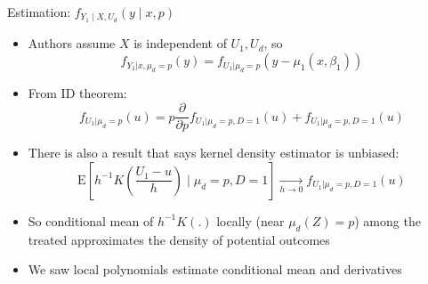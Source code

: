 \documentclass{beamer}
\begin{document}
\begin{frame}{Estimation: $f_{Y_1\mid X,U_d}(y\mid x,p)$}
  \begin{itemize}
\item Authors assume $X$ is independent of $U_1,U_d$, so
\begin{equation*}
  f_{Y_1|x,\mu_d=p}(y) = f_{U_1|\mu_d=p}(y-\mu_1(x,\beta_1))
\end{equation*}

\item From ID theorem:
  \begin{equation*}
    f_{U_1|\mu_d=p}(u) = p \frac{\partial}{\partial
    p}f_{U_1|\mu_d=p,D=1}(u) + f_{U_1|\mu_d=p,D=1}(u)
  \end{equation*}
\item There is also a result that says kernel density estimator is
  unbiased:
  \begin{equation*}
    \mathrm{E}\left[h^{-1}K\left(\frac{U_1-u}{h}\right)\mid \mu_d=p,
      D=1\right]\xrightarrow[h \rightarrow 0]{} f_{U_1|\mu_d=p,D=1}(u)
  \end{equation*}
\item So conditional mean of
  $h^{-1}K(.)$ locally (near $\mu_d(Z)=p$) among the treated approximates the density of potential outcomes
  \item We saw local polynomials estimate conditional mean and derivatives
  \end{itemize}


\end{frame}
\end{document}
